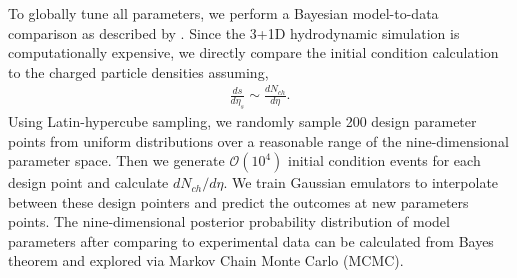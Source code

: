 \documentclass[3p,times,twocolumn]{elsarticle}
\begin{document}
To globally tune all parameters, we perform a Bayesian model-to-data comparison as described by \cite{Bernhard:2015hxa}.
Since the 3+1D hydrodynamic simulation is computationally expensive, we directly compare the initial condition calculation  to the charged particle densities assuming,
\begin{eqnarray}
\frac{ds}{d\eta_s} \sim \frac{dN_{ch}}{d\eta}.
\end{eqnarray}
Using Latin-hypercube sampling, we randomly sample 200 design parameter points from uniform distributions  over a reasonable range of the nine-dimensional parameter space. Then we generate $\mathcal{O}(10^4)$ initial condition events for each design point and calculate $dN_{ch}/d\eta$.
We train Gaussian emulators to interpolate between these design pointers and predict the outcomes at new parameters points.
The nine-dimensional posterior probability distribution of model parameters after comparing to experimental data can be calculated from Bayes theorem and explored via Markov Chain Monte Carlo (MCMC).
\end{document}
